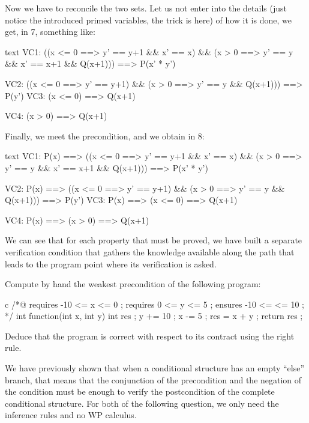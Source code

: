 Now we have to reconcile the two sets. Let us not enter into the details (just
notice the introduced primed variables, the trick is here) of how it is done, we
get, in 7, something like:
\begin{CodeBlock}{text}
  VC1:
    ((x <= 0 ==> y' == y+1 && x' == x) &&
     (x >  0 ==> y' == y   && x' == x+1 && Q(x+1))) ==>
       P(x' * y')

  VC2:
    ((x <= 0 ==> y' == y+1) &&
     (x >  0 ==> y' == y    && Q(x+1))) ==>
       P(y')
  VC3:
    (x <= 0) ==> Q(x+1)

  VC4:
    (x >  0) ==> Q(x+1)
\end{CodeBlock}


Finally, we meet the precondition, and we obtain in 8:
\begin{CodeBlock}{text}
  VC1:
    P(x) ==>
      ((x <= 0 ==> y' == y+1 && x' == x) &&
       (x >  0 ==> y' == y   && x' == x+1 && Q(x+1))) ==>
         P(x' * y')

  VC2:
    P(x) ==>
      ((x <= 0 ==> y' == y+1) &&
       (x >  0 ==> y' == y    && Q(x+1))) ==>
         P(y')
  VC3:
    P(x) ==> (x <= 0) ==> Q(x+1)

  VC4:
    P(x) ==> (x >  0) ==> Q(x+1)
\end{CodeBlock}


We can see that for each property that must be proved, we have built a separate
verification condition that gathers the knowledge available along the path that
leads to the program point where its verification is asked.







Compute by hand the weakest precondition of the following program:


\begin{CodeBlock}{c}
/*@
  requires -10 <= x <= 0 ;
  requires 0 <= y <= 5 ;
  ensures -10 <= \result <= 10 ;
*/
int function(int x, int y){
  int res ;
  y += 10 ;
  x -= 5 ;
  res = x + y ;
  return res ;
}
\end{CodeBlock}


Deduce that the program is correct with respect to its contract using the
right rule.






We have previously shown that when a conditional structure has an empty ``else''
branch, that means that the conjunction of the precondition and the negation
of the condition must be enough to verify the postcondition of the complete
conditional structure.
For both of the following question, we only need the inference rules and
no WP calculus.

